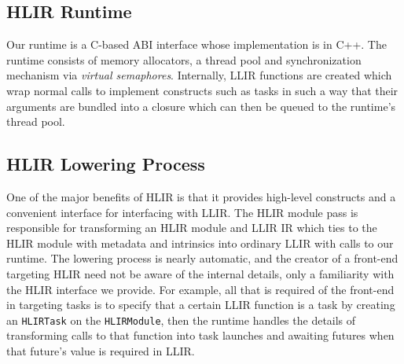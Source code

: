 \documentclass[12pt]{article}
\begin{document}
\subsection{HLIR Runtime}

Our runtime is a C-based ABI interface whose implementation is in C++. The runtime consists of memory allocators, a thread pool and synchronization mechanism via {\it virtual semaphores}. Internally, LLIR functions are created which wrap normal calls to implement constructs such as tasks in such a way that their arguments are bundled into a closure which can then be queued to the runtime's thread pool.

\subsection{HLIR Lowering Process}

One of the major benefits of HLIR is that it provides high-level constructs and a convenient interface for interfacing with LLIR. The HLIR module pass is responsible for transforming an HLIR module and LLIR IR which ties to the HLIR module with metadata and intrinsics into ordinary LLIR with calls to our runtime. The lowering process is nearly automatic, and the creator of a front-end targeting HLIR need not be aware of the internal details, only a familiarity with the HLIR interface we provide.
For example, all that is required of the front-end in targeting tasks is to specify that a certain LLIR function is a task by creating an {\tt HLIRTask} on the {\tt HLIRModule}, then the runtime handles the details of transforming calls to that function into task launches and awaiting futures when that future's value is required in LLIR.
\end{document}
